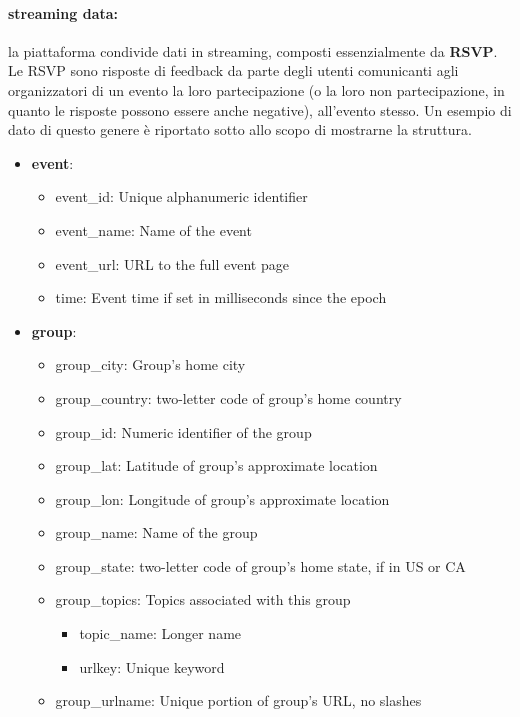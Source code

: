 \documentclass[fleqn,10pt]{SelfArx} %
\begin{document}
{\paragraph{streaming data:} 
la piattaforma condivide dati in streaming, composti essenzialmente da \textbf{RSVP}.
Le RSVP sono risposte di feedback da parte degli utenti comunicanti agli organizzatori di un evento la loro partecipazione (o la loro non partecipazione, in quanto le risposte possono essere anche negative), all'evento stesso.
Un esempio di dato di questo genere è riportato sotto allo scopo di mostrarne la struttura.%
\begin{itemize}[noitemsep]
\item \textbf{event}:
	\begin{itemize}[noitemsep]
	\item event\_id:	Unique alphanumeric identifier
	\item event\_name: Name of the event
	\item event\_url: URL to the full event page
	\item time: Event time if set in milliseconds since the epoch
	\end{itemize}
\item \textbf{group}:
	\begin{itemize}[noitemsep]
    \item group\_city: Group's home city
    \item group\_country: two-letter code of group's home country
    \item group\_id: Numeric identifier of the group
    \item group\_lat: Latitude of group's approximate location
    \item group\_lon: Longitude of group's approximate location
    \item group\_name: Name of the group
    \item group\_state: two-letter code of group's home state, if in US or CA
    \item group\_topics: Topics associated with this group
			\begin{itemize}[noitemsep]
			\item topic\_name: Longer name
        	\item urlkey: Unique keyword
			\end{itemize}
    \item group\_urlname: Unique portion of group's URL, no slashes
	\end{itemize}

\end{itemize}}
\end{document}

